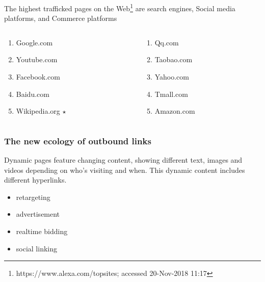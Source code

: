 \documentclass[aspectratio=169]{beamer}
\newcounter{savedenum}
\newcommand*{\saveenum}{\setcounter{savedenum}{\theenumi}}
\newcommand*{\resume}{\setcounter{enumi}{\thesavedenum}}
\begin{document}
{
%
\begin{frame}
%
The highest trafficked pages on the Web\footnote{https://www.alexa.com/topsites; accessed 20-Nov-2018 11:17} are search engines, Social media platforms, and Commerce platforms
\begin{center}
\begin{columns}[T]
  \begin{column}{.3\linewidth}
  \begin{enumerate}
	\item{Google.com}
	\item{Youtube.com}
	\item{Facebook.com}
	\item{Baidu.com}
	\item{Wikipedia.org $\star$}
    \saveenum
  \end{enumerate}
  \end{column}
  \begin{column}{.3\linewidth}
  \begin{enumerate}
    \resume
         \item{Qq.com}
	\item{Taobao.com}
	\item{Yahoo.com}
	\item{Tmall.com}
	\item{Amazon.com}  
	\end{enumerate}
  \end{column}
\end{columns}
\end{center}
%
\end{frame}
}

\begin{frame}
\frametitle{The new ecology of outbound links}
Dynamic pages feature changing content, showing different text, images and videos depending on who's visiting and when. This dynamic content includes different hyperlinks.\\\vspace{0.5cm}
%
\begin{itemize}
\item{retargeting}
\item{advertisement}
\item{realtime bidding}
\item{social linking}
\end{itemize}
%
\end{frame}
\end{document}
